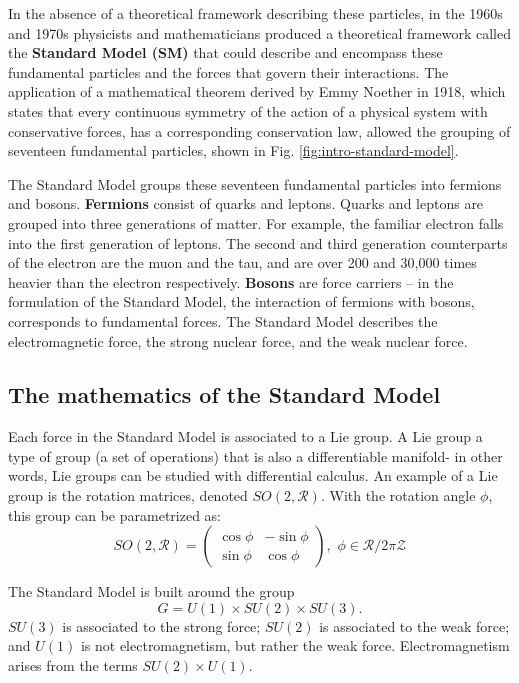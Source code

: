 \documentclass{article}
\begin{document}
In the absence of a theoretical framework describing these particles, in the 1960s and 1970s physicists and mathematicians produced a theoretical framework called the \textbf{Standard Model (SM)} that could describe and encompass these fundamental particles and the forces that govern their interactions. The application of a mathematical theorem derived by Emmy Noether in 1918, which states that every continuous symmetry of the action of a physical system with conservative forces, has a corresponding conservation law, allowed the grouping of seventeen fundamental particles, shown in Fig. \ref{fig:intro-standard-model}.

The Standard Model groups these seventeen fundamental particles into fermions and bosons. \textbf{Fermions} consist of quarks and leptons. Quarks and leptons are grouped into three generations of matter. For example, the familiar electron falls into the first generation of leptons. The second and third generation counterparts of the electron are the muon and the tau, and are over 200 and 30,000 times heavier than the electron respectively. \textbf{Bosons} are force carriers -- in the formulation of the Standard Model, the interaction of fermions with bosons, corresponds to fundamental forces. The Standard Model describes the electromagnetic force, the strong nuclear force, and the weak nuclear force.


\subsection{The mathematics of the Standard Model}

Each force in the Standard Model is associated to a Lie group. A Lie group a type of group (a set of operations) that is also a differentiable manifold- in other words, Lie groups can be studied with differential calculus. An example of a Lie group is the rotation matrices, denoted $SO(2, \mathcal{R})$. With the rotation angle $\phi$, this group can be parametrized as: $$SO(2, \mathcal{R}) = \begin{pmatrix} \cos\phi & -\sin\phi \\ \sin\phi & \cos\phi \end{pmatrix}, \,\, \phi \in \mathcal{R}/2\pi\mathcal{Z}$$

The Standard Model is built around the group $$G = U(1) \times SU(2) \times SU(3).$$ $SU(3)$ is associated to the strong force; $SU(2)$ is associated to the weak force; and $U(1)$ is not electromagnetism, but rather the weak force. Electromagnetism arises from the terms $SU(2) \times U(1)$. 
\end{document}

